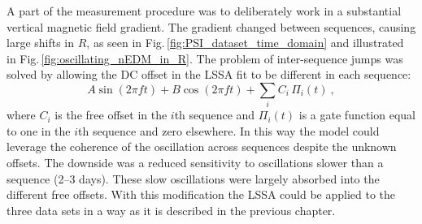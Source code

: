 A part of the measurement procedure was to deliberately work in a substantial vertical magnetic field gradient.
The gradient changed between sequences, causing large shifts in $R$, as seen in Fig.\,\ref{fig:PSI_dataset_time_domain} and illustrated in Fig.\,\ref{fig:oscillating_nEDM_in_R}.
The problem of inter-sequence jumps was solved by allowing the DC offset in the LSSA fit to be different in each sequence:
\begin{equation}
  \label{eq:axions_LSSA}
  A\sin(2 \pi f t) + B\cos(2 \pi f t) + \sum_i C_i\,\Pi_i(t) \ ,
\end{equation}
where $C_i$ is the free offset in the $i$th sequence and $\Pi_i(t)$ is a gate function equal to one in the $i$th sequence and zero elsewhere.
In this way the model could leverage the coherence of the oscillation across sequences despite the unknown offsets.
The downside was a reduced sensitivity to oscillations slower than a sequence (2--3 days).
These slow oscillations were largely absorbed into the different free offsets.
With this modification the LSSA could be applied to the three data sets in a way as it is described in the previous chapter.




